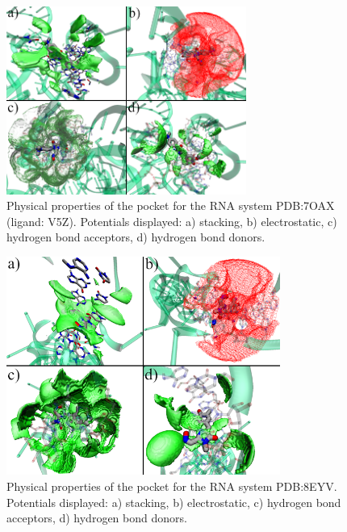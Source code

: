 \begin{figure}[H]
  \centering
  \includegraphics[width=0.7\textwidth]{figures/appendix/benchmark_rna/7oax1.png}
  \caption{\label{fig:appx_benchmark/7oax1} Physical properties of the pocket for the RNA system PDB:7OAX (ligand: V5Z). Potentials displayed: a) stacking, b) electrostatic, c) hydrogen bond acceptors, d) hydrogen bond donors.}
\end{figure}

\begin{figure}[H]
  \centering
  \includegraphics[width=0.8\textwidth]{figures/appendix/benchmark_rna/8eyv.png}
  \caption{\label{fig:appx_benchmark/8eyv} Physical properties of the pocket for the RNA system PDB:8EYV. Potentials displayed: a) stacking, b) electrostatic, c) hydrogen bond acceptors, d) hydrogen bond donors.}
\end{figure}


